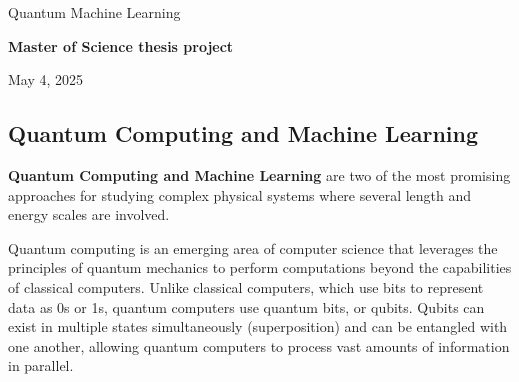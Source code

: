 \documentclass[%
oneside,                 %
final,                   %
10pt]{article}
\begin{document}

\newcommand{\exercisesection}[1]{\subsection*{#1}}






\thispagestyle{empty}

\begin{center}
{\LARGE\bf
\begin{spacing}{1.25}
Quantum Machine Learning
\end{spacing}
}
\end{center}


\begin{center}
{\bf Master of Science thesis project${}^{}$} \\ [0mm]
\end{center}

\begin{center}
\end{center}
    

\begin{center}
May 4, 2025
\end{center}

\vspace{1cm}


\subsection*{Quantum Computing and Machine Learning}

\textbf{Quantum Computing and Machine Learning} are two of the most promising
approaches for studying complex physical systems where several length
and energy scales are involved.  

Quantum computing is an emerging area of computer science that
leverages the principles of quantum mechanics to perform computations
beyond the capabilities of classical computers. Unlike classical
computers, which use bits to represent data as 0s or 1s, quantum
computers use quantum bits, or qubits. Qubits can exist in multiple
states simultaneously (superposition) and can be entangled with one
another, allowing quantum computers to process vast amounts of
information in parallel.
\end{document}
